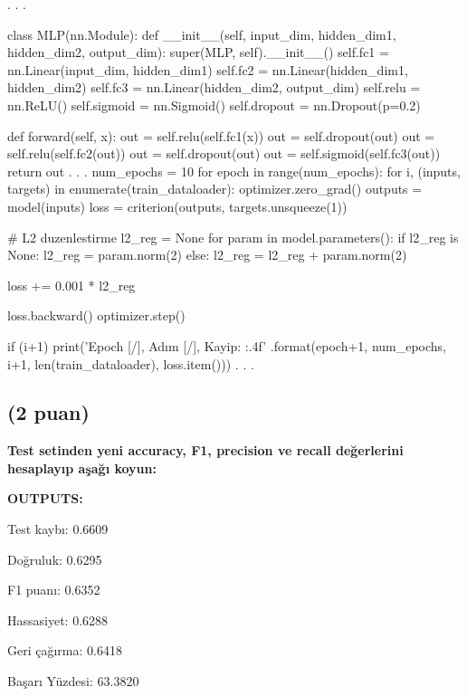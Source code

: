 \documentclass[11pt]{article}
\begin{document}
\begin{python}
    .
    .
    .
    
class MLP(nn.Module):
    def __init__(self, input_dim, hidden_dim1, hidden_dim2, output_dim):
        super(MLP, self).__init__()
        self.fc1 = nn.Linear(input_dim, hidden_dim1)
        self.fc2 = nn.Linear(hidden_dim1, hidden_dim2)
        self.fc3 = nn.Linear(hidden_dim2, output_dim)
        self.relu = nn.ReLU()
        self.sigmoid = nn.Sigmoid()
        self.dropout = nn.Dropout(p=0.2)
        
    def forward(self, x):
        out = self.relu(self.fc1(x))
        out = self.dropout(out)
        out = self.relu(self.fc2(out))
        out = self.dropout(out)
        out = self.sigmoid(self.fc3(out))
        return out
    .
    .
    .
    num_epochs = 10
for epoch in range(num_epochs):
    for i, (inputs, targets) in enumerate(train_dataloader):
        optimizer.zero_grad()
        outputs = model(inputs)
        loss = criterion(outputs, targets.unsqueeze(1))
        
        # L2 duzenlestirme
        l2_reg = None
        for param in model.parameters():
            if l2_reg is None:
                l2_reg = param.norm(2)
            else:
                l2_reg = l2_reg + param.norm(2)
        
        loss += 0.001 * l2_reg
        
        loss.backward()
        optimizer.step()

        if (i+1) %
            print('Epoch [{}/{}], Adım [{}/{}], Kayip: {:.4f}'
                  .format(epoch+1, num_epochs, i+1, len(train_dataloader), loss.item()))
        .
        .
        .
        
                  
\end{python}

\subsection{(2 puan)} \textbf{Test setinden yeni accuracy, F1, precision ve recall değerlerini hesaplayıp aşağı koyun:
}

\textbf{OUTPUTS:}

Test kaybı: 0.6609

Doğruluk: 0.6295

F1 puanı: 0.6352

Hassasiyet: 0.6288

Geri çağırma: 0.6418

Başarı Yüzdesi: 63.3820
\end{document}
